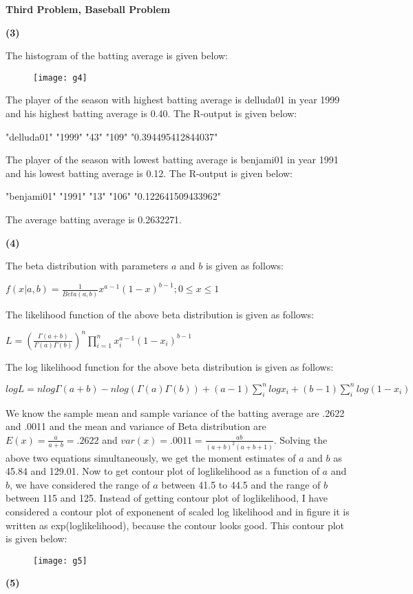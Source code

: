 \documentclass[10pt]{article}
\begin{document}
\begin{center}
\textbf{Third Problem, Baseball Problem}
\end{center}
\begin{center}
\textbf{(3)}
\end{center}
\begin{newpage}
The histogram of the batting average is given below:
\begin{figure}[h]
\begin{center}
\texttt{[image: g4]}
\end{center}
\end{figure}
The player of the season with highest batting average is delluda01 in year 1999 and his highest batting average is 0.40. The R-output is given below: 

"delluda01" "1999" "43" "109" "0.394495412844037"

The player of the season with lowest batting average is benjami01 in year 1991 and his lowest batting average is 0.12. The R-output is given below:

"benjami01" "1991" "13" "106" "0.122641509433962"

The average batting average is  0.2632271.
\begin{center}
\textbf{(4)}
\end{center}
The beta distribution with parameters $a$ and $b$ is given as follows:

$f(x|a,b)=\frac{1}{Beta(a,b)}x^{a-1}(1-x)^{b-1}; 0\leq x \leq 1$

The likelihood function of the above beta distribution is given as follows:

$L=(\frac{\Gamma(a+b)}{\Gamma(a)\Gamma(b)})^n\prod_{i=1}^{n}x_{i}^{a-1}(1-x_{i})^{b-1}$

The log likelihood function for the above beta distribution is given as follows:

$logL=nlog\Gamma(a+b)-nlog(\Gamma(a)\Gamma(b))+(a-1)\sum_{i}^{n}logx_{i}+(b-1)\sum_{i}^{n}log(1-x_{i})$

We know the sample mean and sample variance of the batting average are .2622 and .0011 and the mean and variance of Beta distribution are $E(x)=\frac{a}{a+b}=.2622$ and $var(x)=.0011=\frac{ab}{(a+b)^2(a+b+1)}$. Solving the above two equations simultaneously, we get the moment estimates of $a$ and $b$ as 45.84 and 129.01. Now to get contour plot of loglikelihood as a function of $a$ and $b$, we have considered the range of $a$ between 41.5 to 44.5 and the range of $b$ between 115 and 125. Instead of getting contour plot of loglikelihood, I have considered a contour plot of exponenent of scaled log likelihood and in figure it is written as exp(loglikelihood), because the contour looks good. This contour plot is given below:
\begin{figure}[h]
\begin{center}
\texttt{[image: g5]}
\end{center}
\end{figure}
\begin{center}
\textbf{(5)}
\end{center}


\end{newpage}
\end{document}
